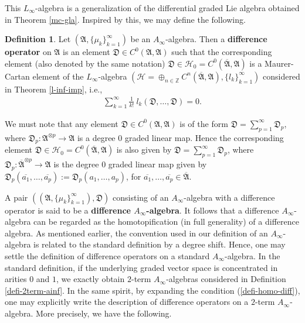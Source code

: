 \documentclass[a4paper,reqno,10pt]{amsart}
\theoremstyle{plain}
\theoremstyle{definition}
\newtheorem{defn}[thm]{Definition}
\theoremstyle{remark}
\begin{document}
This $L_\infty$-algebra is a generalization of the differential graded Lie algebra obtained in Theorem \ref{mc-gla}. Inspired by this, we may define the following.

\begin{defn}\label{defi-diff-homo}
   Let $(\mathfrak{A}, \{ \mu_k \}_{k=1}^\infty)$ be an $A_\infty$-algebra. Then a {\bf difference operator} on $\mathfrak{A}$ is an element $\mathfrak{D} \in C^0 (\mathfrak{A}, \mathfrak{A})$ such that the corresponding element (also denoted by the same notation) $\mathfrak{D} \in \mathcal{H}_0 = C^0 (\overline{\mathfrak{A}}, \mathfrak{A})$ is a Maurer-Cartan element of the $L_\infty$-algebra $(\mathcal{H} =  \oplus_{n \in \mathbb{Z}} C^n ( \overline{\mathfrak{A}},  \mathfrak{A}   ), \{ l_k \}_{k=1}^\infty)$ considered in Theorem \ref{l-inf-imp}, i.e.,
    \begin{align}\label{defi-homo-diff}
         \sum_{k=1}^\infty \frac{1}{k! } ~ \! l_k (\mathfrak{D}, \ldots, \mathfrak{D}) = 0.
    \end{align}
\end{defn}
\noindent We must note that any element $\mathfrak{D} \in C^0 (\mathfrak{A}, \mathfrak{A})$ is of the form $\mathfrak{D} = \sum_{p=1}^\infty \mathfrak{D}_p$, where $\mathfrak{D}_p : \mathfrak{A}^{\otimes p} \rightarrow \mathfrak{A}$ is a degree $0$ graded linear map. Hence the corresponding element $\mathfrak{D} \in \mathcal{H}_0 =  C^0 (\overline{\mathfrak{A}}, \mathfrak{A})$ is also given by $\mathfrak{D} = \sum_{p=1}^\infty \mathfrak{D}_p$, where $\mathfrak{D}_p :  \overline{\mathfrak{A}}^{\otimes p} \rightarrow \mathfrak{A}$ is the degree $0$ graded linear map given by $\mathfrak{D}_p ( \overline{a_1}, \ldots, \overline{a_p}) := \mathfrak{D}_p (a_1, \ldots, a_p)$, for $\overline{a_1}, \ldots, \overline{a_p} \in \overline{\mathfrak{A}}$.

\medskip

A pair $((\mathfrak{A}, \{ \mu_k \}_{k=1}^\infty), \mathfrak{D})$ consisting of an $A_\infty$-algebra with a difference operator is said to be a {\bf difference $A_\infty$-algebra}. It follows that a difference $A_\infty$-algebra can be regarded as the homotopification (in full generality) of a difference algebra. As mentioned earlier, the convention used in our definition of an $A_\infty$-algebra is related to the standard definition by a degree shift. Hence, one may settle the definition of difference operators on a standard $A_\infty$-algebra. In the standard definition, if the underlying graded vector space is concentrated in arities $0$ and $1$, we exactly obtain $2$-term $A_\infty$-algebras considered in Definition \ref{defi-2term-ainf}. In the same spirit, by expanding the condition (\ref{defi-homo-diff}), one may explicitly write the description of difference operators on a $2$-term $A_\infty$-algebra. More precisely, we have the following.
\end{document}
